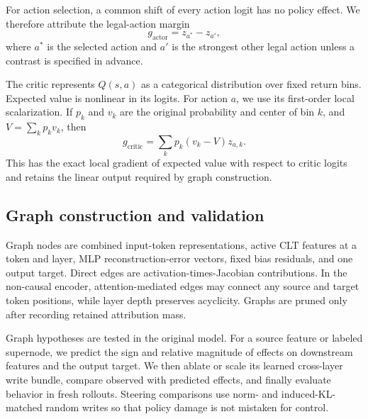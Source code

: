 For action selection, a common shift of every action logit has no policy effect. We therefore attribute the legal-action margin
\begin{equation}
    g_{\mathrm{actor}}=z_{a^*}-z_{a'},
\end{equation}
where $a^*$ is the selected action and $a'$ is the strongest other legal action unless a contrast is specified in advance.

The critic represents $Q(s,a)$ as a categorical distribution over fixed return bins. Expected value is nonlinear in its logits. For action $a$, we use its first-order local scalarization. If $p_k$ and $v_k$ are the original probability and center of bin $k$, and $V=\sum_kp_kv_k$, then
\begin{equation}
    g_{\mathrm{critic}}=\sum_k p_k(v_k-V)z_{a,k}.
\end{equation}
This has the exact local gradient of expected value with respect to critic logits and retains the linear output required by graph construction.

\subsection{Graph construction and validation}

Graph nodes are combined input-token representations, active CLT features at a token and layer, MLP reconstruction-error vectors, fixed bias residuals, and one output target. Direct edges are activation-times-Jacobian contributions. In the non-causal encoder, attention-mediated edges may connect any source and target token positions, while layer depth preserves acyclicity. Graphs are pruned only after recording retained attribution mass.

Graph hypotheses are tested in the original model. For a source feature or labeled supernode, we predict the sign and relative magnitude of effects on downstream features and the output target. We then ablate or scale its learned cross-layer write bundle, compare observed with predicted effects, and finally evaluate behavior in fresh rollouts. Steering comparisons use norm- and induced-KL-matched random writes so that policy damage is not mistaken for control.
